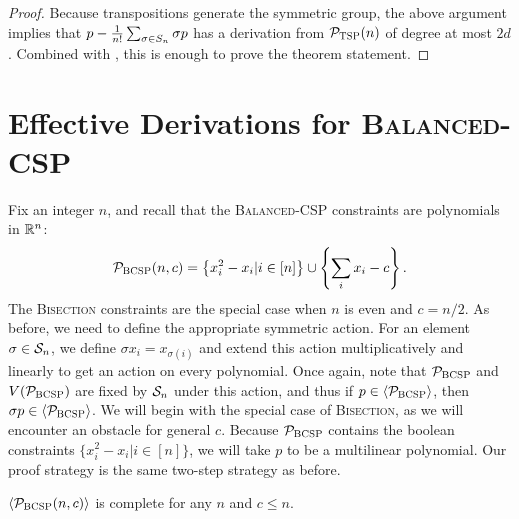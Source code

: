 \begin{proof}
Because transpositions generate the symmetric group, the above argument implies that $p - \frac{1}{n!}\sum_{\sigma \in S_{n}} \sigma p$ has a derivation from $\mathcal P_{\textsc{TSP}}(n)$ of degree at most $2d$. Combined with , this is enough to prove the theorem statement. 
\end{proof}

\section{Effective Derivations for \textsc{Balanced-CSP}}\label{sec:bcsp}
Fix an integer $n$, and recall that the \textsc{Balanced-CSP} constraints are polynomials in $\mathbb R^n$:
\begin{align}
\mathcal P_{\textsc{BCSP}}(n,c) = \left\{x_i^2 - x_i| i \in [n]\right\} \cup \left\{\sum_i x_i - c\right\}.\label{eq:bcsp-formulation}
\end{align}
The \textsc{Bisection} constraints are the special case when $n$ is even and $c = n/2$. 
As before, we need to define the appropriate symmetric action. For an element $\sigma \in \mathcal S_n$, we define $\sigma x_i = x_{\sigma(i)}$ and extend this action multiplicatively and linearly to get an action on every polynomial. 
Once again, note that $\mathcal P_{\textsc{BCSP}}$ and $V(\mathcal P_{\textsc{BCSP}})$ are fixed by $\mathcal S_n$ under this action, and thus if $p \in \langle \mathcal P_{\textsc{BCSP}} \rangle$, then $\sigma p \in \langle \mathcal P_{\textsc{BCSP}} \rangle$. 
We will begin with the special case of \textsc{Bisection}, as we will encounter an obstacle for general $c$. 
Because $\mathcal P_{\textsc{BCSP}}$ contains the boolean constraints $\{x_i^2 - x_i | i \in [n]\}$, we will take $p$ to be a multilinear polynomial. 
Our proof strategy is the same two-step strategy as before. 
\begin{lemma}\label{lem:bcsp-complete}
$\langle \mathcal P_{\textsc{BCSP}}(n,c) \rangle$ is complete for any $n$ and $c \leq n$.
\end{lemma}
